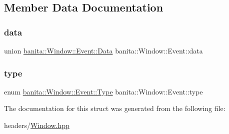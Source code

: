 \subsection{Member Data Documentation}
\mbox{\label{structbanita_1_1_window_1_1_event_a1b8d8286e719931337c294db3fd49b11}} 
\subsubsection{\texorpdfstring{data}{data}}
{\footnotesize\ttfamily union \mbox{\hyperlink{unionbanita_1_1_window_1_1_event_1_1_data}{banita\+::\+Window\+::\+Event\+::\+Data}}
             banita\+::\+Window\+::\+Event\+::data}

\mbox{\label{structbanita_1_1_window_1_1_event_a465ac3171aa3d833333b37c4d2d5fff7}} 
\subsubsection{\texorpdfstring{type}{type}}
{\footnotesize\ttfamily enum \mbox{\hyperlink{structbanita_1_1_window_1_1_event_a9124fe8193c7ed78b96220363ce692c3}{banita\+::\+Window\+::\+Event\+::\+Type}}
             banita\+::\+Window\+::\+Event\+::type}



The documentation for this struct was generated from the following file\+:\begin{DoxyCompactItemize}
\item 
headers/\mbox{\hyperlink{_window_8hpp}{Window.\+hpp}}\end{DoxyCompactItemize}
